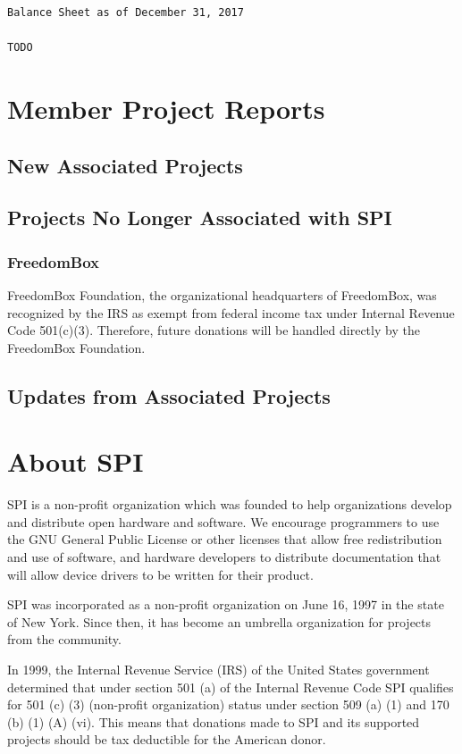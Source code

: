 \documentclass[a4paper]{report}
\begin{document}
\begin{verbatim}
Balance Sheet as of December 31, 2017

TODO
\end{verbatim}

\chapter{Member Project Reports}

\section{New Associated Projects}

\section{Projects No Longer Associated with SPI}

\subsection{FreedomBox}

FreedomBox Foundation, the organizational headquarters of FreedomBox,
was recognized by the IRS as exempt from federal income tax under
Internal Revenue Code 501(c)(3).  Therefore, future donations will
be handled directly by the FreedomBox Foundation.

\section{Updates from Associated Projects}


\appendix
\chapter{About SPI}

SPI is a non-profit organization which was founded to help organizations
develop and distribute open hardware and software. We encourage programmers
to use the GNU General Public License or other licenses that allow free
redistribution and use of software, and hardware developers to distribute
documentation that will allow device drivers to be written for their product.

SPI was incorporated as a non-profit organization on June 16, 1997 in the state
of New York. Since then, it has become an umbrella organization for projects
from the community.

In 1999, the Internal Revenue Service (IRS) of the United States government
determined that under section 501 (a) of the Internal Revenue Code SPI
qualifies for 501 (c) (3) (non-profit organization) status under section 509
(a) (1) and 170 (b) (1) (A) (vi). This means that donations made to SPI and its
supported projects should be tax deductible for the American donor.
\end{document}
